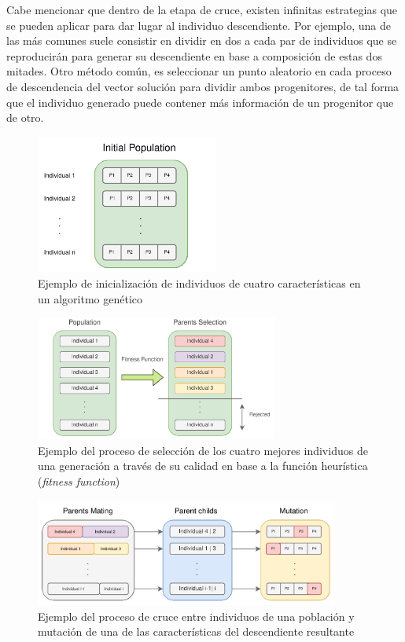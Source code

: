 Cabe mencionar que dentro de la etapa de cruce, existen infinitas estrategias que se pueden aplicar para dar lugar al individuo descendiente. Por ejemplo, una de las más comunes suele consistir en dividir en dos a cada par de individuos que se reproducirán para generar su descendiente en base a composición de estas dos mitades. Otro método común, es seleccionar un punto aleatorio en cada proceso de descendencia del vector solución para dividir ambos progenitores, de tal forma que el individuo generado puede contener más información de un progenitor que de otro.

\begin{figure}[h]
	\centering
	\includegraphics[width=6cm]{Figures/GA/inicializacion.png}
	\caption{Ejemplo de inicialización de individuos de cuatro características en un algoritmo genético}
	\label{GA_inicializacion}
\end{figure}
\begin{figure}[h]
	\centering
	\includegraphics[width=8cm]{Figures/GA/selection.png}
	\caption{Ejemplo del proceso de selección de los cuatro mejores individuos de una generación a través de su calidad en base a la función heurística (\textit{fitness function})}
	\label{GA_selection}
\end{figure}
\begin{figure}[h]
	\centering
	\includegraphics[width=10cm]{Figures/GA/cruce_mutacion.png}
	\caption{Ejemplo del proceso de cruce entre individuos de una población y mutación de una de las características del descendiente resultante}
	\label{GA_cruce_mutacion}
\end{figure}

